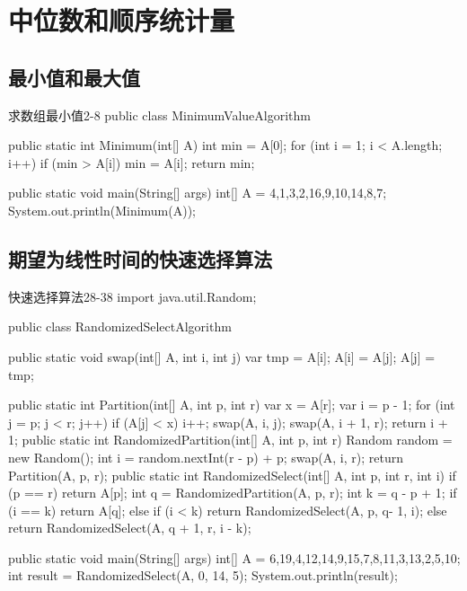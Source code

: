 \documentclass[oneside,10pt,fontset=none]{ctexbook}
\numberwithin{definition}{chapter}
\numberwithin{theorem}{chapter}
\numberwithin{lemma}{chapter}
\begin{document}
\chapter{中位数和顺序统计量}

\section{最小值和最大值}

\begin{myjava}{}{求数组最小值}{2-8}
public class MinimumValueAlgorithm {
    public static int Minimum(int[] A) {
        int min = A[0];
        for (int i = 1; i < A.length; i++)
            if (min > A[i])
                min = A[i];
        return min;
    }

    public static void main(String[] args) {
        int[] A = {4,1,3,2,16,9,10,14,8,7};
        System.out.println(Minimum(A));
    }
}
\end{myjava}

\section{期望为线性时间的快速选择算法}

\begin{myjava}{}{快速选择算法}{28-38}
import java.util.Random;

public class RandomizedSelectAlgorithm {
    public static void swap(int[] A, int i, int j) {
        var tmp = A[i];
        A[i] = A[j];
        A[j] = tmp;
    }

    public static int Partition(int[] A, int p, int r) {
        var x = A[r];
        var i = p - 1;
        for (int j = p; j < r; j++) {
            if (A[j] < x) {
                i++;
                swap(A, i, j);
            }
        }
        swap(A, i + 1, r);
        return i + 1;
    }
    public static int RandomizedPartition(int[] A, int p, int r) {
        Random random = new Random();
        int i = random.nextInt(r - p) + p;
        swap(A, i, r);
        return Partition(A, p, r);
    }
    public static int RandomizedSelect(int[] A, int p, int r, int i) {
        if (p == r) return A[p];
        int q = RandomizedPartition(A, p, r);
        int k = q - p + 1;
        if (i == k)
            return A[q];
        else if (i < k)
            return RandomizedSelect(A, p, q- 1, i);
        else
            return RandomizedSelect(A, q + 1, r, i - k);
    }

    public static void main(String[] args) {
        int[] A = {6,19,4,12,14,9,15,7,8,11,3,13,2,5,10};
        int result = RandomizedSelect(A, 0, 14, 5);
        System.out.println(result);
    }
}
\end{myjava}
\end{document}
